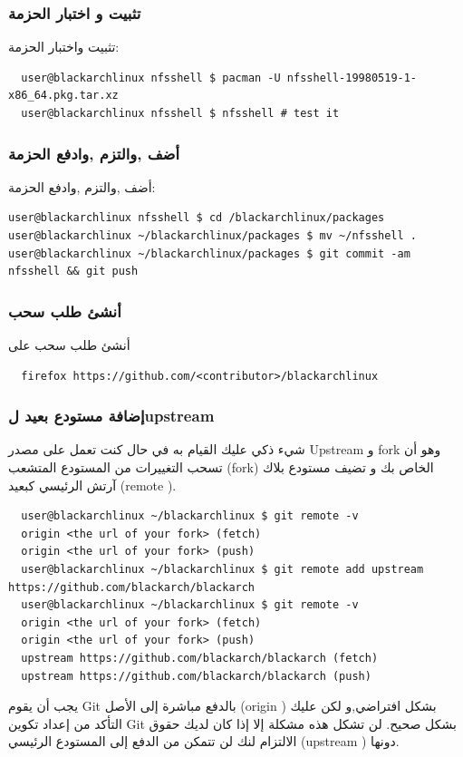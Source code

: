 \documentclass[a4paper, oneside, 11pt]{book}
\def\href#1#2{\htmladdnormallink{#2}{#1}}
\begin{document}
\subsubsection{تثبيت و اختبار الحزمة }
   تثبيت واختبار الحزمة:
\begin{lstlisting}
  user@blackarchlinux nfsshell $ pacman -U nfsshell-19980519-1-x86_64.pkg.tar.xz
  user@blackarchlinux nfsshell $ nfsshell # test it
\end{lstlisting}

\subsubsection{أضف ,والتزم ,وادفع الحزمة }
أضف ,والتزم ,وادفع الحزمة: 
\begin{lstlisting}user@blackarchlinux nfsshell $ cd /blackarchlinux/packages
user@blackarchlinux ~/blackarchlinux/packages $ mv ~/nfsshell .
user@blackarchlinux ~/blackarchlinux/packages $ git commit -am nfsshell && git push
\end{lstlisting}

\subsubsection{أنشئ طلب سحب }
أنشئ طلب سحب على  \href{https://github.com/}{github.com}
\begin{lstlisting}
  firefox https://github.com/<contributor>/blackarchlinux
\end{lstlisting}

\subsubsection{إضافة مستودع بعيد لupstream}
شيء ذكي عليك القيام به في حال كنت تعمل على مصدر Upstream و fork وهو أن تسحب التغييرات من المستودع المتشعب (fork) الخاص بك و تضيف مستودع بلاك آرتش الرئيسي كبعيد (remote ).
\begin{lstlisting}
  user@blackarchlinux ~/blackarchlinux $ git remote -v
  origin <the url of your fork> (fetch)
  origin <the url of your fork> (push)
  user@blackarchlinux ~/blackarchlinux $ git remote add upstream https://github.com/blackarch/blackarch
  user@blackarchlinux ~/blackarchlinux $ git remote -v
  origin <the url of your fork> (fetch)
  origin <the url of your fork> (push)
  upstream https://github.com/blackarch/blackarch (fetch)
  upstream https://github.com/blackarch/blackarch (push)
\end{lstlisting}

يجب أن يقوم Git بالدفع مباشرة إلى الأصل (origin ) بشكل افتراضي,و لكن عليك التأكد من إعداد تكوين Git بشكل صحيح. لن تشكل هذه مشكلة إلا إذا كان لديك حقوق الالتزام لنك لن تتمكن من الدفع إلى المستودع الرئيسي (upstream ) دونها.
\end{document}

